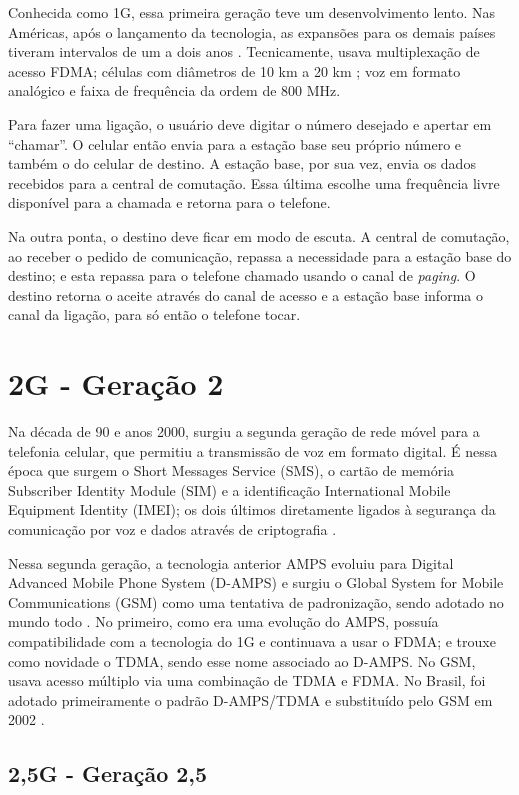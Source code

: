 \documentclass[11pt,oneside,a4paper]{abntex2}
\begin{document}
Conhecida como 1G, essa primeira geração teve um desenvolvimento lento. Nas Américas, após o lançamento da tecnologia, as expansões para os demais países tiveram intervalos de um a dois anos \cite{repor1}. Tecnicamente, usava multiplexação de acesso FDMA; células com diâmetros de 10 km a 20 km \cite{aula3}; voz em formato analógico e faixa de frequência da ordem de 800 MHz.

Para fazer uma ligação, o usuário deve digitar o número desejado e apertar em ``chamar''. O celular então envia para a estação base seu próprio número e também o do celular de destino. A estação base, por sua vez, envia os dados recebidos para a central de comutação. Essa última escolhe uma frequência livre disponível para a chamada e retorna para o telefone.

Na outra ponta, o destino deve ficar em modo de escuta. A central de comutação, ao receber o pedido de comunicação, repassa a necessidade para a estação base do destino; e esta repassa para o telefone chamado  usando o canal de \textit{paging}. O destino retorna o aceite através do canal de acesso e a estação base informa o canal da ligação, para só então o telefone tocar.

\section*{2G - Geração 2}
\label{2g}

Na década de 90 e anos 2000, surgiu a segunda geração de rede móvel para a telefonia celular, que permitiu a transmissão de voz em formato digital. É nessa época que surgem o Short Messages Service (SMS), o cartão de memória Subscriber Identity Module (SIM) e a identificação International Mobile Equipment Identity (IMEI); os dois últimos diretamente ligados à segurança da comunicação por voz e dados através de criptografia \cite{tcc2}.

Nessa segunda geração, a tecnologia anterior AMPS evoluiu para Digital Advanced Mobile Phone System (D-AMPS) e surgiu o Global System for Mobile Communications (GSM) como uma tentativa de padronização, sendo adotado no mundo todo \cite{aula3}. No primeiro, como era uma evolução do AMPS, possuía compatibilidade com a tecnologia do 1G e continuava a usar o FDMA; e trouxe como novidade o TDMA, sendo esse nome associado ao D-AMPS. No GSM, usava acesso múltiplo via uma combinação de TDMA e FDMA. No Brasil, foi adotado primeiramente o padrão D-AMPS/TDMA e substituído pelo GSM em 2002 \cite{tcc2}.

\subsection*{2,5G - Geração 2,5}
\end{document}
